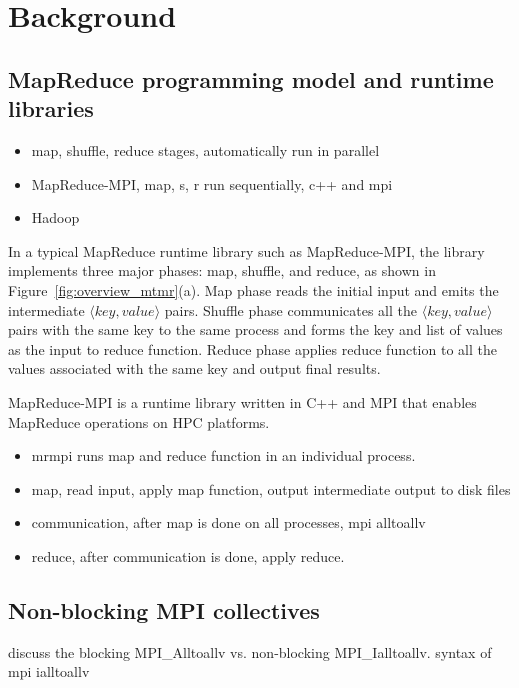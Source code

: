 

\section{Background}
\label{background}
\subsection{MapReduce programming model and runtime libraries}
\begin{itemize}
\item map, shuffle, reduce stages, automatically run in parallel
\item MapReduce-MPI, map, s, r run sequentially, c++ and mpi
\item Hadoop
\end{itemize}

In a typical MapReduce runtime library such as MapReduce-MPI, the library
implements three major phases: map, shuffle, and reduce, as shown in 
Figure~\ref{fig:overview_mtmr}(a). Map phase reads the initial input and
emits the intermediate $\langle key, value \rangle$ pairs. Shuffle phase communicates
all the $\langle key, value \rangle$ pairs with the same key to the same process
and forms the key and list of values as the input to reduce function. Reduce
phase applies reduce function to all the values associated with the
same key and output final results.

MapReduce-MPI is a runtime library written in C++ and MPI that
enables MapReduce operations on HPC platforms.
\begin{itemize}
\item mrmpi runs map and reduce function in an individual process.
\item map, read input, apply map function, output intermediate 
output to disk files
\item communication, after map is done on all processes, 
mpi alltoallv
\item reduce, after communication is done, apply reduce.
\end{itemize}

\subsection{Non-blocking MPI collectives}
discuss the blocking MPI\_Alltoallv vs. non-blocking MPI\_Ialltoallv.
syntax of mpi ialltoallv
